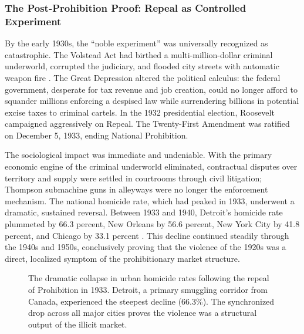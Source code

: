 \subsubsection{The Post-Prohibition Proof: Repeal as Controlled Experiment}

By the early 1930s, the ``noble experiment'' was universally recognized as catastrophic. The Volstead Act had birthed a multi-million-dollar criminal underworld, corrupted the judiciary, and flooded city streets with automatic weapon fire \cite{mobmuseum_repeal}. The Great Depression altered the political calculus: the federal government, desperate for tax revenue and job creation, could no longer afford to squander millions enforcing a despised law while surrendering billions in potential excise taxes to criminal cartels. In the 1932 presidential election, Roosevelt campaigned aggressively on Repeal. The Twenty-First Amendment was ratified on December 5, 1933, ending National Prohibition.

The sociological impact was immediate and undeniable. With the primary economic engine of the criminal underworld eliminated, contractual disputes over territory and supply were settled in courtrooms through civil litigation; Thompson submachine guns in alleyways were no longer the enforcement mechanism. The national homicide rate, which had peaked in 1933, underwent a dramatic, sustained reversal. Between 1933 and 1940, Detroit's homicide rate plummeted by 66.3 percent, New Orleans by 56.6 percent, New York City by 41.8 percent, and Chicago by 33.1 percent \cite{hoplofobia_prohibition, newdeal_crime}. This decline continued steadily through the 1940s and 1950s, conclusively proving that the violence of the 1920s was a direct, localized symptom of the prohibitionary market structure.

\begin{figure}[htbp]
\centering
{}
\caption{The dramatic collapse in urban homicide rates following the repeal of Prohibition in 1933. Detroit, a primary smuggling corridor from Canada, experienced the steepest decline (66.3\%). The synchronized drop across all major cities proves the violence was a structural output of the illicit market.}
\label{fig:post-repeal-decline}
\end{figure}

